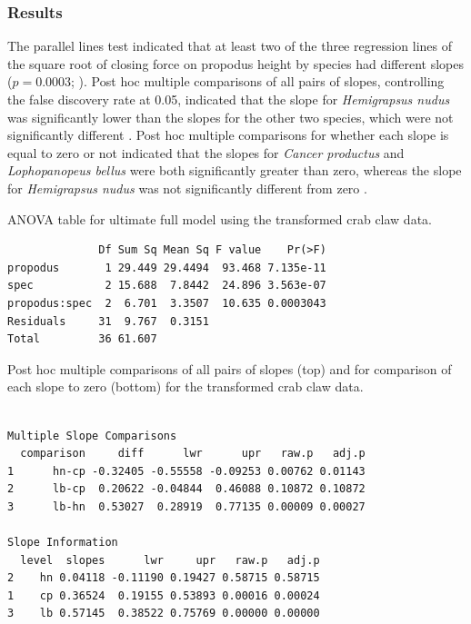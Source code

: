 \documentclass[10pt,openany]{book}\usepackage[]{graphicx}\usepackage[]{color}
\makeatletter
\newenvironment{kframe}{%
 \def\at@end@of@kframe{}%
 \ifinner\ifhmode%
  \def\at@end@of@kframe{\end{minipage}}%
  \begin{minipage}{\columnwidth}%
 \fi\fi%
 \def\FrameCommand##1{\hskip\@totalleftmargin \hskip-\fboxsep
 \colorbox{shadecolor}{##1}\hskip-\fboxsep
     \hskip-\linewidth \hskip-\@totalleftmargin \hskip\columnwidth}%
 \MakeFramed {\advance\hsize-\width
   \@totalleftmargin\z@ \linewidth\hsize
   \@setminipage}}%
 {\par\unskip\endMakeFramed%
 \at@end@of@kframe}
\newenvironment{knitrout}{}{} %
\makeatother
\begin{document}
\subsubsection*{Results}
The parallel lines test indicated that at least two of the three regression lines of the square root of closing force on propodus height by species had different slopes ($p=0.0003$; ).  Post hoc multiple comparisons of all pairs of slopes, controlling the false discovery rate at 0.05, indicated that the slope for \emph{Hemigrapsus nudus} was significantly lower than the slopes for the other two species, which were not significantly different .  Post hoc multiple comparisons for whether each slope is equal to zero or not indicated that the slopes for \emph{Cancer productus} and \emph{Lophopanopeus bellus} were both significantly greater than zero, whereas the slope for \emph{Hemigrapsus nudus} was not significantly different from zero .

\begin{table}[h]
  \centering
  \caption{ANOVA table for ultimate full model using the transformed crab claw data.}\label{tab:IVRCrabParallelTest}
\begin{knitrout}
\color{fgcolor}\begin{kframe}
\begin{verbatim}
              Df Sum Sq Mean Sq F value    Pr(>F)
propodus       1 29.449 29.4494  93.468 7.135e-11
spec           2 15.688  7.8442  24.896 3.563e-07
propodus:spec  2  6.701  3.3507  10.635 0.0003043
Residuals     31  9.767  0.3151                  
Total         36 61.607                          
\end{verbatim}
\end{kframe}
\end{knitrout}
\end{table}

\begin{table}[h]
  \centering
  \caption{Post hoc multiple comparisons of all pairs of slopes (top) and for comparison of each slope to zero (bottom) for the transformed crab claw data.}\label{tab:IVRCrabSlopeComp}
\begin{knitrout}
\color{fgcolor}\begin{kframe}
\begin{verbatim}

Multiple Slope Comparisons
  comparison     diff      lwr      upr   raw.p   adj.p
1      hn-cp -0.32405 -0.55558 -0.09253 0.00762 0.01143
2      lb-cp  0.20622 -0.04844  0.46088 0.10872 0.10872
3      lb-hn  0.53027  0.28919  0.77135 0.00009 0.00027

Slope Information
  level  slopes      lwr     upr   raw.p   adj.p
2    hn 0.04118 -0.11190 0.19427 0.58715 0.58715
1    cp 0.36524  0.19155 0.53893 0.00016 0.00024
3    lb 0.57145  0.38522 0.75769 0.00000 0.00000
\end{verbatim}
\end{kframe}
\end{knitrout}
\end{table}
\end{document}
